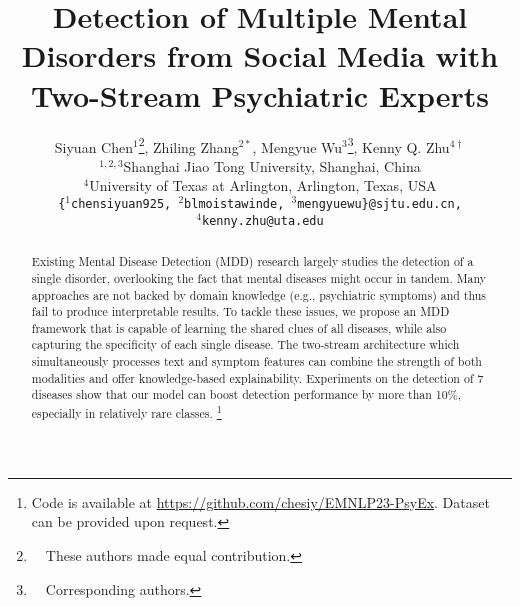 \documentclass[11pt]{article}
\title{Detection of Multiple Mental Disorders from Social Media with Two-Stream Psychiatric Experts}
\author{Siyuan Chen$^1$\thanks{~~These authors made equal contribution.}, Zhiling Zhang$^{2*}$, Mengyue Wu$^3$\thanks{~~Corresponding authors.}, Kenny Q. Zhu$^{4\dagger}$  \\ 
$^{1,2,3}$Shanghai Jiao Tong University, Shanghai, China \\
$^{4}$University of Texas at Arlington, Arlington, Texas, USA\\
\texttt{\{$^1$chensiyuan925, $^2$blmoistawinde, $^3$mengyuewu\}@sjtu.edu.cn,}\\
\texttt{$^4$kenny.zhu@uta.edu}
}
\begin{document}
\maketitle
\begin{abstract}
Existing Mental Disease Detection (MDD) research largely studies the detection of a single disorder, overlooking the fact that mental diseases might occur in tandem. Many approaches are not backed by domain knowledge (e.g., psychiatric symptoms) and thus fail to produce interpretable results. 
To tackle these issues, we propose an MDD framework that is capable of learning the shared clues of all diseases, while also capturing the specificity of each single disease. 
The two-stream architecture which simultaneously processes text and symptom features can combine the strength of both modalities and offer knowledge-based explainability. 
Experiments on the detection of 7 diseases show that our model can boost detection performance by more than 10\%, especially in relatively rare classes. 
\footnote{Code is available at \url{https://github.com/chesiy/EMNLP23-PsyEx}. Dataset can be provided upon request.}
\end{abstract}












\appendix


\end{document}
